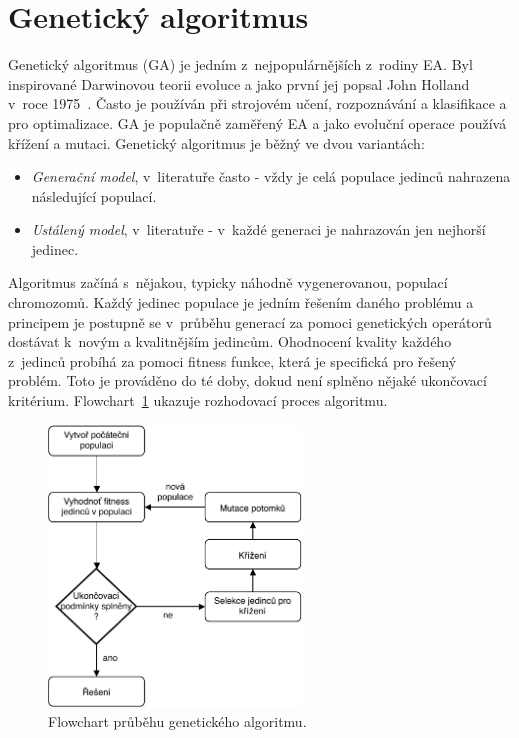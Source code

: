 \section{Genetický algoritmus}
\label{algs:ga}
Genetický algoritmus (GA) je jedním z~nejpopulárnějších z~rodiny EA. Byl inspirované Darwinovou teorii evoluce a jako první jej popsal John Holland v~roce 1975~\cite{GAIntro}. Často je používán při strojovém učení, rozpoznávání a klasifikace a pro optimalizace. GA je populačně zaměřený EA a jako evoluční operace používá křížení a mutaci. Genetický algoritmus je běžný ve dvou variantách:
\begin{itemize}
    \item \textit{Generační model}, v~literatuře často  - vždy je celá populace jedinců nahrazena následující populací.
    \item \textit{Ustálený model}, v~literatuře  - v~každé generaci je nahrazován jen nejhorší jedinec.
\end{itemize}

\bigskip

Algoritmus začíná s~nějakou, typicky náhodně vygenerovanou, populací chromozomů. Každý jedinec populace je jedním řešením daného problému a principem je postupně se v~průběhu generací za pomoci genetických operátorů dostávat k~novým a kvalitnějším jedincům. Ohodnocení kvality každého z~jedinců probíhá za pomoci fitness funkce, která je specifická pro řešený problém. Toto je prováděno do té doby, dokud není splněno nějaké ukončovací kritérium. Flowchart~\ref{fg:gaFlow} ukazuje rozhodovací proces algoritmu.\\

\begin{figure}[hbt]
	\centering
	\includegraphics[width=0.6\textwidth]{obrazky-figures/gaFlow.pdf}
	\caption{Flowchart průběhu genetického algoritmu.}
	\label{fg:gaFlow}
\end{figure}

